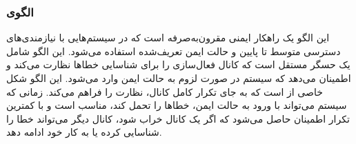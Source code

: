 \subsubsection{الگوی }
\label{archSafeMonActSec}
\begin{RTL}
این الگو یک راهکار ایمنی مقرون‌به‌صرفه است که در سیستم‌هایی
با نیازمندی‌های دسترسی متوسط تا پایین و حالت ایمن تعریف‌شده استفاده می‌شود.
این الگو شامل یک حسگر مستقل است که کانال فعال‌سازی
را برای شناسایی خطاها نظارت می‌کند و اطمینان می‌دهد که
سیستم در صورت لزوم به حالت ایمن وارد می‌شود. این الگو شکل
خاصی از  است که به جای تکرار
کامل کانال، نظارت را فراهم می‌کند. زمانی که سیستم می‌تواند با ورود
به حالت ایمن، خطاها را تحمل کند، مناسب است و
با کمترین تکرار اطمینان حاصل می‌شود که اگر یک کانال خراب شود،
کانال دیگر می‌تواند خطا را شناسایی کرده یا به کار خود ادامه دهد.
\end{RTL}